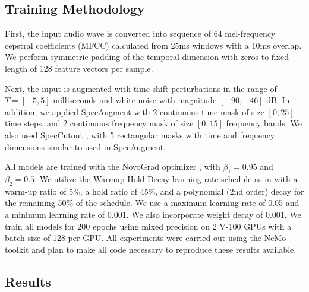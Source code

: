 \documentclass[a4paper]{article}
\begin{document}
\subsection{Training Methodology}

First, the input audio wave is converted into sequence of 64  mel-frequency cepstral coefficients (MFCC) calculated from 25ms windows with a 10ms overlap. We perform symmetric padding of the temporal dimension with zeros to fixed length of 128 feature vectors per sample. 

Next, the input is augmented with time shift perturbations in the range of $T=[-5, 5]$ milliseconds and white noise with magnitude $[-90, -46]$ dB. In addition, we applied SpecAugment \cite{park2019} with 2 continuous time mask of size $[0, 25]$ time steps, and 2 continuous frequency mask of size $[0, 15]$ frequency bands. We also used SpecCutout \cite{devries2017specutout}, with 5 rectangular masks with time and frequency dimensions similar to used in SpecAugment. 

All models are trained with the NovoGrad optimizer \cite{novograd2019}, with $\beta_1 = 0.95$ and $\beta_2 = 0.5$. We utilize the Warmup-Hold-Decay learning rate schedule as in \cite{he2019bag} with a warm-up ratio of 5\%, a hold ratio of 45\%, and a polynomial (2nd order) decay for the remaining 50\% of the schedule.  We use a maximum learning rate of 0.05 and a minimum learning rate of 0.001. We also incorporate weight decay of 0.001. 
We train all models for 200 epochs using mixed precision  \cite{micikevicius2017mixed} on 2 V-100 GPUs with a batch size of 128 per GPU. 
All experiments were carried out using the NeMo toolkit \cite{nemo2019} and plan to make all code necessary to reproduce these results available.


\subsection{Results}
\end{document}
